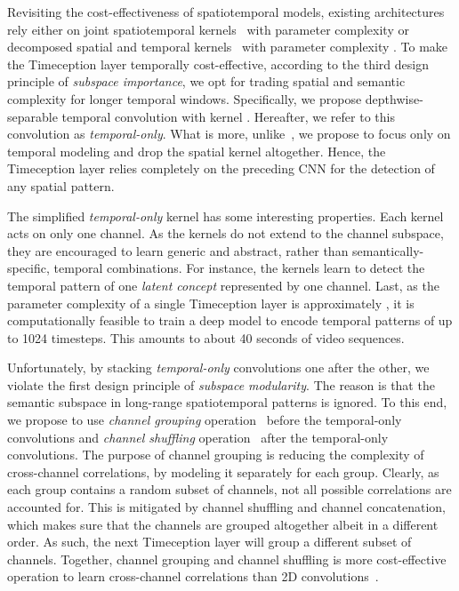 \documentclass[10pt,twocolumn,letterpaper]{article}
\begin{document}
Revisiting the cost-effectiveness of spatiotemporal models, existing architectures rely either on joint spatiotemporal kernels~\cite{carreira2017quo} with parameter complexity  or decomposed spatial and temporal kernels~\cite{xie2017rethinking,tran2018closer} with parameter complexity .
To make the Timeception layer temporally cost-effective, according to the third design principle of \emph{subspace importance}, we opt for trading spatial and semantic complexity for longer temporal windows.
Specifically, we propose depthwise-separable temporal convolution with kernel . Hereafter, we refer to this convolution as \emph{temporal-only}.
What is more, unlike~\cite{carreira2017quo,xie2017rethinking,tran2018closer}, we propose to focus only on temporal modeling and drop the spatial kernel  altogether.
Hence, the Timeception layer relies completely on the preceding CNN for the detection of any spatial pattern.

The simplified \emph{temporal-only} kernel has some interesting properties.
Each kernel acts on only one channel.
As the kernels do not extend to the channel subspace, they are encouraged to learn generic and abstract, rather than semantically-specific, temporal combinations.
For instance, the kernels learn to detect the temporal pattern of one \emph{latent concept} represented by one channel.
Last, as the parameter complexity of a single Timeception layer is approximately , it is computationally feasible to train a deep model to encode temporal patterns of up to 1024 timesteps. 
This amounts to about 40 seconds of video sequences.

Unfortunately, by stacking \emph{temporal-only} convolutions one after the other, we violate the first design principle of \emph{subspace modularity}.
The reason is that the semantic subspace in long-range spatiotemporal patterns is ignored.
To this end, we propose to use \emph{channel grouping} operation~\cite{xie2017aggregated} before the temporal-only convolutions and \emph{channel shuffling} operation~\cite{zhang2017shufflenet} after the temporal-only convolutions.
The purpose of channel grouping is reducing the complexity of cross-channel correlations, by modeling it separately for each group.
Clearly, as each group contains a random subset of channels, not all possible correlations are accounted for.
This is mitigated by channel shuffling and channel concatenation, which makes sure that the channels are grouped altogether albeit in a different order.
As such, the next Timeception layer will group a different subset of channels.
Together, channel grouping and channel shuffling is more cost-effective operation to learn cross-channel correlations than  2D convolutions~\cite{chollet2016xception}.
\end{document}
